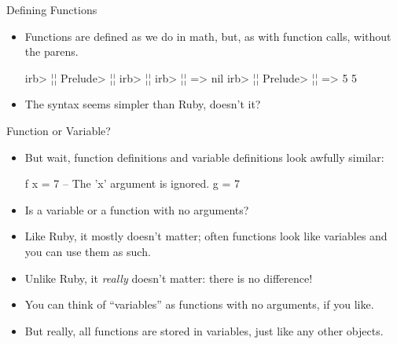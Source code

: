 \documentclass[xcolor=dvipsnames]{beamer}          %
\newcommand{\lH}[1]{\color{MidnightBlue}{#1}}
\newcommand{\lR}[1]{\color{BrickRed}{#1}}
\begin{document}
\begin{frame}[fragile]{Defining Functions}
\begin{itemize}
    \item Functions are defined as we do in math, but, as with function
        calls, without the parens.
        \begin{olisting}
            irb> ¦\lR{def add x, y}¦   Prelude> ¦\lH{let add x y = x + y}¦
            irb>     ¦\lR{x + y}¦
            irb> ¦\lR{end}¦
            => nil
            irb> ¦\lR{add 2, 3}¦       Prelude> ¦\lH{add 2 3}¦
            => 5                5
        \end{olisting}
    \item The syntax seems simpler than Ruby, doesn't it?
\end{itemize}
\end{frame}


\begin{frame}[fragile]{Function or Variable?}
\begin{itemize}
    \item<1-> But wait, function definitions and variable definitions look
        awfully similar:
        \begin{hlisting}
            f x = 7         -- The 'x' argument is ignored.
            g   = 7
        \end{hlisting}
    \item<2-> Is  a variable or a function with no arguments?
    \item<3-> Like Ruby, it mostly doesn't matter; often functions look
        like variables and you can use them as such.
    \item<4-> Unlike Ruby, it \emph{really} doesn't matter: there is
        no difference!
    \item<5->You can think of ``variables'' as functions with no arguments,
        if you like.
    \item<5->But really, all functions are stored in variables, just like
        any other objects.
\end{itemize}
\end{frame}
\end{document}
